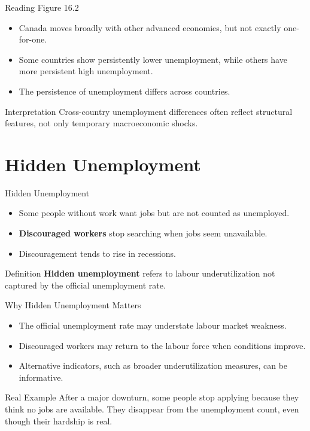 \documentclass[aspectratio=169]{beamer}
\begin{document}
\begin{frame}{Reading Figure 16.2}
\transfade
\begin{itemize}
  \item Canada moves broadly with other advanced economies, but not exactly one-for-one.
  \item Some countries show persistently lower unemployment, while others have more persistent high unemployment.
  \item The persistence of unemployment differs across countries.
\end{itemize}

\begin{block}{Interpretation}
Cross-country unemployment differences often reflect structural features, not only temporary macroeconomic shocks.
\end{block}
\end{frame}

\section{Hidden Unemployment}

\begin{frame}{Hidden Unemployment}
\transfade
\begin{itemize}
  \item Some people without work want jobs but are not counted as unemployed.
  \item \textbf{Discouraged workers} stop searching when jobs seem unavailable.
  \item Discouragement tends to rise in recessions.
\end{itemize}

\begin{block}{Definition}
\textbf{Hidden unemployment} refers to labour underutilization not captured by the official unemployment rate.
\end{block}
\end{frame}

\begin{frame}{Why Hidden Unemployment Matters}
\transfade
\begin{itemize}
  \item The official unemployment rate may understate labour market weakness.
  \item Discouraged workers may return to the labour force when conditions improve.
  \item Alternative indicators, such as broader underutilization measures, can be informative.
\end{itemize}

\begin{exampleblock}{Real Example}
After a major downturn, some people stop applying because they think no jobs are available. They disappear from the unemployment count, even though their hardship is real.
\end{exampleblock}
\end{frame}
\end{document}
